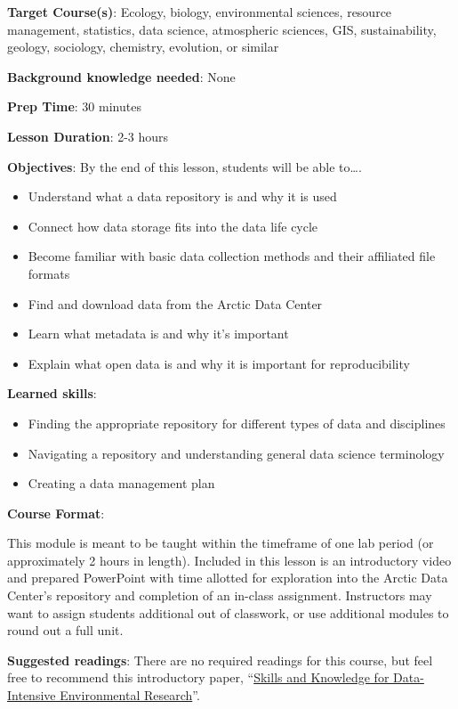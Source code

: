 \documentclass[]{book}
\providecommand{\tightlist}{%
  \setlength{\itemsep}{0pt}\setlength{\parskip}{0pt}}
\begin{document}
\textbf{Target Course(s)}: Ecology, biology, environmental sciences, resource management, statistics, data science, atmospheric sciences, GIS, sustainability, geology, sociology, chemistry, evolution, or similar

\textbf{Background knowledge needed}: None

\textbf{Prep Time}: 30 minutes

\textbf{Lesson Duration}: 2-3 hours

\textbf{Objectives}: By the end of this lesson, students will be able to\ldots{}.

\begin{itemize}
\tightlist
\item
  Understand what a data repository is and why it is used
\item
  Connect how data storage fits into the data life cycle
\item
  Become familiar with basic data collection methods and their affiliated file formats
\item
  Find and download data from the Arctic Data Center
\item
  Learn what metadata is and why it's important
\item
  Explain what open data is and why it is important for reproducibility
\end{itemize}

\textbf{Learned skills}:

\begin{itemize}
\tightlist
\item
  Finding the appropriate repository for different types of data and disciplines\\
\item
  Navigating a repository and understanding general data science terminology
\item
  Creating a data management plan
\end{itemize}

\textbf{Course Format}:

This module is meant to be taught within the timeframe of one lab period (or approximately 2 hours in length). Included in this lesson is an introductory video and prepared PowerPoint with time allotted for exploration into the Arctic Data Center's repository and completion of an in-class assignment. Instructors may want to assign students additional out of classwork, or use additional modules to round out a full unit.

\textbf{Suggested readings}: There are no required readings for this course, but feel free to recommend this introductory paper, ``\href{https://academic.oup.com/bioscience/article/67/6/546/3784601?login=true}{Skills and Knowledge for Data-Intensive Environmental Research}''.
\end{document}
